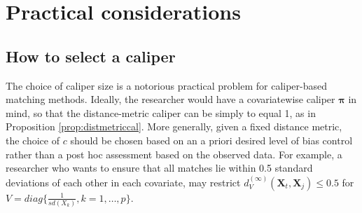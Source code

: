 \documentclass{article}
\newcommand{\Xt}{\mathbf{X}_t}
\newcommand{\Xj}{\mathbf{X}_j}
\begin{document}
\appendix

\section{Practical considerations}






\subsection{How to select a caliper}
\label{app:caliperchoice}

The choice of caliper size is a notorious practical problem for caliper-based matching methods.
Ideally, the researcher would have a covariatewise caliper $\boldsymbol{\pi}$ in mind, so that the distance-metric caliper can be simply to equal 1, as in Proposition \ref{prop:distmetriccal}.
More generally, given a fixed distance metric, the choice of $c$ should be chosen based on an a priori desired level of bias control rather than a post hoc assessment based on the observed data.
For example, a researcher who wants to ensure that all matches lie within 0.5 standard deviations of each other in each covariate, may restrict $d_V^{(\infty)}(\Xt, \Xj) \leq 0.5$ for $V = diag\{\frac{1}{sd(X_k)}, k=1, \dots, p\}$.
\end{document}
